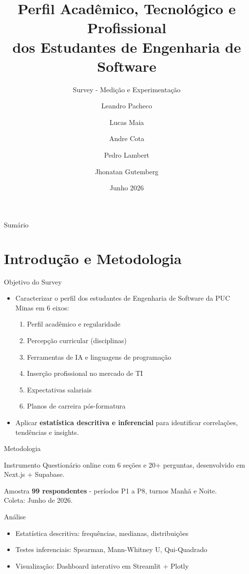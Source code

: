 \documentclass[fleqn]{beamer}
\title[Survey - Eng. Software PUC Minas]{Perfil Acadêmico, Tecnológico e Profissional\\dos Estudantes de Engenharia de Software}
\subtitle{Survey - Medição e Experimentação}
\author[Pacheco et al.]{Leandro Pacheco \and Lucas Maia \and Andre Cota \and Pedro Lambert \and Jhonatan Gutemberg}
\institute[PUC Minas]{Pontifícia Universidade Católica de Minas Gerais\\Departamento de Engenharia de Software}
\date{Junho 2026}
\begin{document}
\begin{frame}
  \titlepage
\end{frame}

\begin{frame}{Sumário}
    \tableofcontents
\end{frame}

\section{Introdução e Metodologia}

\begin{frame}{Objetivo do Survey}
\begin{itemize}
    \item Caracterizar o perfil dos estudantes de Engenharia de Software da PUC Minas em 6 eixos:
    \begin{enumerate}
        \item Perfil acadêmico e regularidade
        \item Percepção curricular (disciplinas)
        \item Ferramentas de IA e linguagens de programação
        \item Inserção profissional no mercado de TI
        \item Expectativas salariais
        \item Planos de carreira pós-formatura
    \end{enumerate}
    \item Aplicar \textbf{estatística descritiva e inferencial} para identificar correlações, tendências e insights.
\end{itemize}
\end{frame}

\begin{frame}{Metodologia}
\begin{block}{Instrumento}
Questionário online com 6 seções e 20+ perguntas, desenvolvido em Next.js + Supabase.
\end{block}

\begin{block}{Amostra}
\textbf{99 respondentes} - períodos P1 a P8, turnos Manhã e Noite.\\
Coleta: Junho de 2026.
\end{block}

\begin{block}{Análise}
\begin{itemize}
    \item Estatística descritiva: frequências, medianas, distribuições
    \item Testes inferenciais: Spearman, Mann-Whitney U, Qui-Quadrado
    \item Visualização: Dashboard interativo em Streamlit + Plotly
\end{itemize}
\end{block}
\end{frame}
\end{document}
